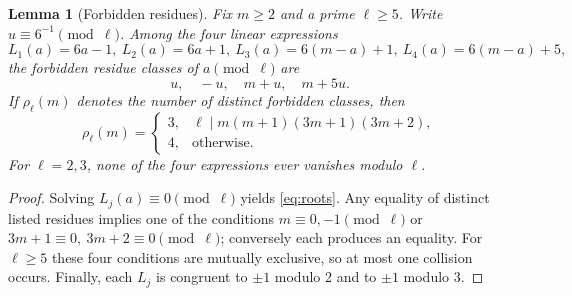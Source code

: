 \documentclass[11pt,a4paper]{article}
\numberwithin{equation}{section}
\newtheorem{lemma}[conjecture]{Lemma}
\theoremstyle{definition}
\begin{document}
\begin{lemma}[Forbidden residues]\label{lem:residues}
Fix \(m\ge2\) and a prime \(\ell\ge5\). Write \(u\equiv6^{-1}\pmod\ell\). Among the four linear expressions
\begin{equation}\label{eq:forms}
L_1(a)=6a-1,\ L_2(a)=6a+1,\ L_3(a)=6(m-a)+1,\ L_4(a)=6(m-a)+5,
\end{equation}
the forbidden residue classes of \(a\pmod\ell\) are
\begin{equation}\label{eq:roots}
u,\quad -u,\quad m+u,\quad m+5u.
\end{equation}
If \(\rho_\ell(m)\) denotes the number of distinct forbidden classes, then
\begin{equation}\label{eq:rho}
\rho_\ell(m)=
\begin{cases}
3,&\ell\mid m(m+1)(3m+1)(3m+2),\\
4,&\text{otherwise}.
\end{cases}
\end{equation}
For \(\ell=2,3\), none of the four expressions ever vanishes modulo \(\ell\).
\end{lemma}
\begin{proof}
Solving \(L_j(a)\equiv0\pmod\ell\) yields \eqref{eq:roots}. Any equality of distinct listed residues implies one of the conditions
\(m\equiv0,-1\pmod\ell\) or \(3m+1\equiv0,\ 3m+2\equiv0\pmod\ell\); conversely each produces an equality. For \(\ell\ge5\) these four conditions are mutually exclusive, so at most one collision occurs. Finally, each \(L_j\) is congruent to \(\pm1\) modulo 2 and to \(\pm1\) modulo 3.
\end{proof}
\end{document}
